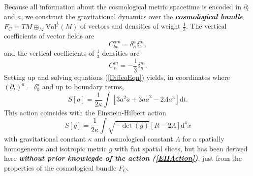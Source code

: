 \documentclass[%
preprint,
titlepage,
nofootinbib,
amsmath,amssymb,
showkeys,
aps,
prd,
floatfix,
]{revtex4-2}
\begin{document}
Because all information about the cosmological metric spacetime is encoded in $\partial_t$ and $a$, we construct the gravitational dynamics over the \textbf{\textit{cosmological bundle}} $F_C = TM \oplus_M \mathrm{Vol}^{\frac{1}{3}}(M)$ of vectors and densities of weight $\frac{1}{3}$. The vertical coefficients of vector fields are
\begin{equation}
    C^{a m}_{b n} = \delta^{a}_{n} \delta^{m}_{b},
\end{equation}
and the vertical coefficients of $\frac{1}{3}$ densities are
\begin{equation}
    C^{m}_{n} = -\frac{1}{3} \delta^{m}_{n}.
\end{equation}
Setting up and solving equations (\ref{DiffeoEqn}) yields, in coordinates where $(\partial_t)^a = \delta^a_0$ and up to boundary terms,
\begin{equation}\label{EHAction}
    S[a] = \frac{1}{2\kappa} \int \left\lbrack 3a^2 \ddot a + 3a \dot a^2 - 2 \Lambda a^3\right\rbrack \mathrm dt.
\end{equation}
This action coincides with the Einstein-Hilbert action
\begin{equation}
    S[g] = \frac{1}{2\kappa} \int \sqrt{-\operatorname{det} (g)}\left\lbrack R - 2 \Lambda\right\rbrack \mathrm d^4x
\end{equation}
with gravitational constant $\kappa$ and cosmological constant $\Lambda$ for a spatially homogeneous and isotropic metric $g$ with flat spatial slices, but has been derived here \textbf{\textit{without prior knowlegde of the action (\ref{EHAction})}}, just from the properties of the cosmological bundle $F_C$.
\end{document}
